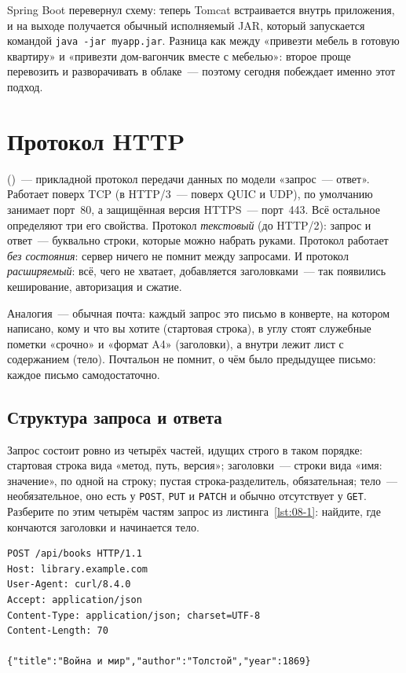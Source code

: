 Spring Boot перевернул схему: теперь Tomcat встраивается внутрь приложения, и
на выходе получается обычный исполняемый JAR, который запускается командой
\texttt{java -jar myapp.jar}. Разница как между «привезти мебель в готовую
квартиру» и «привезти дом-вагончик вместе с мебелью»: второе проще перевозить и
разворачивать в облаке~--- поэтому сегодня побеждает именно этот подход.

\section{Протокол HTTP}

 ()~--- прикладной протокол
передачи данных по модели «запрос~--- ответ». Работает поверх TCP (в
HTTP/3~--- поверх QUIC и UDP), по умолчанию занимает порт~80, а защищённая
версия HTTPS~--- порт~443. Всё остальное определяют три его свойства. Протокол
\emph{текстовый} (до HTTP/2): запрос и ответ~--- буквально строки, которые
можно набрать руками. Протокол работает \emph{без состояния}: сервер ничего не
помнит между запросами. И протокол \emph{расширяемый}: всё, чего не хватает,
добавляется заголовками~--- так появились кеширование, авторизация и сжатие.

Аналогия~--- обычная почта: каждый запрос это письмо в конверте, на котором
написано, кому и что вы хотите (стартовая строка), в углу стоят служебные
пометки «срочно» и «формат A4» (заголовки), а внутри лежит лист с содержанием
(тело). Почтальон не помнит, о чём было предыдущее письмо: каждое письмо
самодостаточно.

\subsection{Структура запроса и ответа}

Запрос состоит ровно из четырёх частей, идущих строго в таком порядке:
стартовая строка вида «метод, путь, версия»; заголовки~--- строки вида «имя:
значение», по одной на строку; пустая строка-разделитель, обязательная;
тело~--- необязательное, оно есть у \texttt{POST}, \texttt{PUT} и
\texttt{PATCH} и обычно отсутствует у \texttt{GET}. Разберите по этим четырём
частям запрос из листинга~\ref{lst:08-1}: найдите, где кончаются заголовки и
начинается тело.

\begin{listing}[H]
\begin{verbatim}
POST /api/books HTTP/1.1
Host: library.example.com
User-Agent: curl/8.4.0
Accept: application/json
Content-Type: application/json; charset=UTF-8
Content-Length: 70

{"title":"Война и мир","author":"Толстой","year":1869}
\end{verbatim}
\caption{HTTP-запрос целиком}
\label{lst:08-1}
\end{listing}


